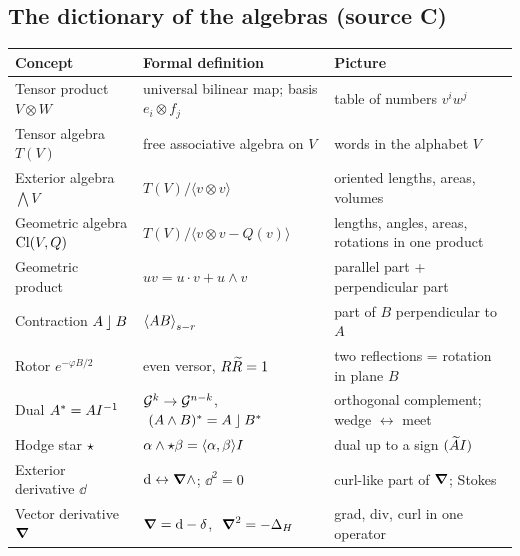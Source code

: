 \subsection{The dictionary of the algebras (source C)}
\begin{center}
\renewcommand{\arraystretch}{1.35}
\begin{tabular}{p{4.6cm}p{5.6cm}p{4.6cm}}
\hline
\textbf{Concept} & \textbf{Formal definition} & \textbf{Picture}\\\hline
Tensor product $V\otimes W$ & universal bilinear map; basis $e_i\otimes f_j$ & table of numbers $v^iw^j$\\
Tensor algebra $T(V)$ & free associative algebra on $V$ & words in the alphabet $V$\\
Exterior algebra $\bigwedge V$ & $T(V)/\langle v\otimes v\rangle$ & oriented lengths, areas, volumes\\
Geometric algebra $\mathrm{Cl}(V,Q)$ & $T(V)/\langle v\otimes v-Q(v)\rangle$ & lengths, angles, areas, rotations in one product\\
Geometric product & $uv=u\cdot v+u\wedge v$ & parallel part + perpendicular part\\
Contraction $A\mathbin{\rfloor} B$ & $\left\langle AB \right\rangle_{s-r}$ & part of $B$ perpendicular to $A$\\
Rotor $e^{-\varphi B/2}$ & even versor, $R\widetilde{R}=1$ & two reflections = rotation in plane $B$\\
Dual $A^{\ast}=AI^{-1}$ & $\mathcal{G}^k\to\mathcal{G}^{n-k}$, $\ (A\wedge B)^*=A\mathbin{\rfloor} B^*$ & orthogonal complement; wedge $\leftrightarrow$ meet\\
Hodge star $\star$ & $\alpha\wedge\star\beta=\langle\alpha,\beta\rangle I$ & dual up to a sign $(\widetilde{A}I)$\\
Exterior derivative $\dd$ & $\mathrm{d}\leftrightarrow\boldsymbol{\nabla}\wedge$; $\dd^2=0$ & curl-like part of $\boldsymbol{\nabla}$; Stokes\\
Vector derivative $\boldsymbol{\nabla}$ & $\boldsymbol{\nabla}=\mathrm{d}-\delta$, $\ \boldsymbol{\nabla}^2=-\Delta_H$ & grad, div, curl in one operator\\\hline
\end{tabular}
\end{center}
